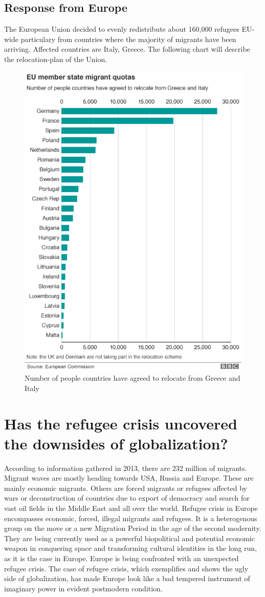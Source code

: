 \subsection{Response from Europe}
The European Union decided to evenly redistribute about 160,000 refugees EU-wide particulary from countries where the majority of migrants have been arriving. Affected countries are Italy, Greece. The following chart will describe the relocation-plan of the Union.

\begin{figure}[!h]
	\begin{center}
		\includegraphics[width=0.5\linewidth]{images/asylums_redistribution}
		\caption{Number of people countries have agreed to relocate from Greece and Italy}
		\label{broker}
	\end{center}
\end{figure}
\newpage
\section{Has the refugee crisis uncovered the downsides of \mbox{globalization}?}

According to information gathered in 2013, there are 232 million of migrants. Migrant waves are mostly heading towards USA, Russia and Europe. These are mainly economic migrants. Others are forced migrants or refugees affected by wars or deconstruction of countries due to export of democracy and search for vast oil fields in the Middle East and all over the world. Refugee crisis in Europe encompasses economic, forced, illegal migrants and refugees. It is a heterogenous group on the move or a new Migration Period in the age of the second modernity. They are being currently used as a powerful biopolitical and potential economic weapon in conquering space and transforming cultural identities in the long run, as it is the case in Europe. Europe is being confronted with an unexpected refugee crisis. The case of refugee crisis, which exemplifies and shows the ugly side of globalization, has made Europe look like a bad tempered instrument of imaginary power in evident postmodern condition.

